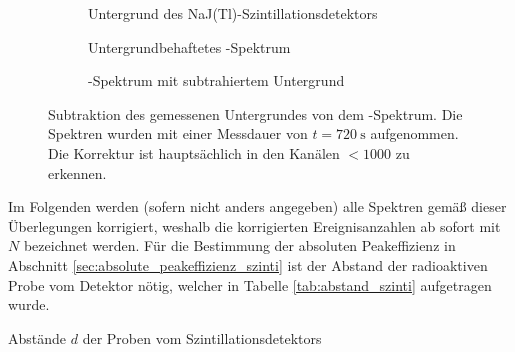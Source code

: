\documentclass[11pt, a4paper]{article}
\numberwithin{equation}{section}
\begin{document}
\begin{figure}[hp]
	\centering
	\begin{subfigure}[b]{0.65\textwidth}
		\resizebox{!}{0.285\textheight}{
		
		}
		\caption{Untergrund des NaJ(Tl)-Szintillationsdetektors}
		\label{fig:untergrund_szinti}
	\end{subfigure}
	
	\begin{subfigure}[b]{0.65\textwidth}
		\resizebox{!}{0.285\textheight}{
		
		}
		\caption{Untergrundbehaftetes -Spektrum}
		\label{fig:cobalt_mit_untergrund}
	\end{subfigure}
	
	\begin{subfigure}[b]{0.65\textwidth}
		\resizebox{!}{0.285\textheight}{
		
		}
		\caption{-Spektrum mit subtrahiertem Untergrund}
		\label{fig:cobalt_ohne_untergrund}
	\end{subfigure}
	\caption{Subtraktion des gemessenen Untergrundes von dem -Spektrum. Die Spektren wurden mit einer Messdauer von $t = \SI{720}{\second}$ aufgenommen. Die Korrektur ist hauptsächlich in den Kanälen $< 1000$ zu erkennen.}
	\label{fig:abzug_untergrund}
\end{figure}
Im Folgenden werden (sofern nicht anders angegeben) alle Spektren gemäß dieser Überlegungen korrigiert, weshalb die korrigierten Ereignisanzahlen ab sofort mit $N$ bezeichnet werden.
Für die Bestimmung der absoluten Peakeffizienz in Abschnitt \ref{sec:absolute_peakeffizienz_szinti} ist der Abstand der radioaktiven Probe vom Detektor nötig, welcher in Tabelle \ref{tab:abstand_szinti} aufgetragen wurde.
\begin{table}[h]
	\centering
	
	\caption{Abstände $d$ der Proben vom Szintillationsdetektors}
	\label{tab:abstand_szinti}
\end{table}
\end{document}
